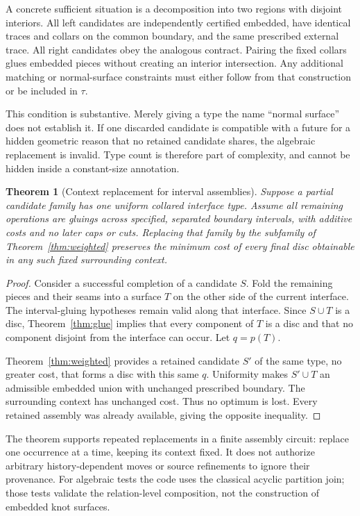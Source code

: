 \documentclass[11pt,a4paper]{article}
\newtheorem{theorem}{Theorem}[section]
\theoremstyle{remark}\newtheorem{remark}[theorem]{Remark}
\begin{document}
A concrete sufficient situation is a decomposition into two regions with disjoint interiors. All left candidates are independently certified embedded, have identical traces and collars on the common boundary, and the same prescribed external trace. All right candidates obey the analogous contract. Pairing the fixed collars glues embedded pieces without creating an interior intersection. Any additional matching or normal-surface constraints must either follow from that construction or be included in $\tau$.

This condition is substantive. Merely giving a type the name ``normal surface'' does not establish it. If one discarded candidate is compatible with a future for a hidden geometric reason that no retained candidate shares, the algebraic replacement is invalid. Type count is therefore part of complexity, and cannot be hidden inside a constant-size annotation.

\begin{theorem}[Context replacement for interval assemblies]\label{thm:context}
Suppose a partial candidate family has one uniform collared interface type. Assume all remaining operations are gluings across specified, separated boundary intervals, with additive costs and no later caps or cuts. Replacing that family by the subfamily of Theorem~\ref{thm:weighted} preserves the minimum cost of every final disc obtainable in any such fixed surrounding context.
\end{theorem}
\begin{proof}
Consider a successful completion of a candidate $S$. Fold the remaining pieces and their seams into a surface $T$ on the other side of the current interface. The interval-gluing hypotheses remain valid along that interface. Since $S\cup T$ is a disc, Theorem~\ref{thm:glue} implies that every component of $T$ is a disc and that no component disjoint from the interface can occur. Let $q=p(T)$.

Theorem~\ref{thm:weighted} provides a retained candidate $S'$ of the same type, no greater cost, that forms a disc with this same $q$. Uniformity makes $S'\cup T$ an admissible embedded union with unchanged prescribed boundary. The surrounding context has unchanged cost. Thus no optimum is lost. Every retained assembly was already available, giving the opposite inequality.
\end{proof}

The theorem supports repeated replacements in a finite assembly circuit: replace one occurrence at a time, keeping its context fixed. It does not authorize arbitrary history-dependent moves or source refinements to ignore their provenance. For algebraic tests the code uses the classical acyclic partition join; those tests validate the relation-level composition, not the construction of embedded knot surfaces.
\end{document}
